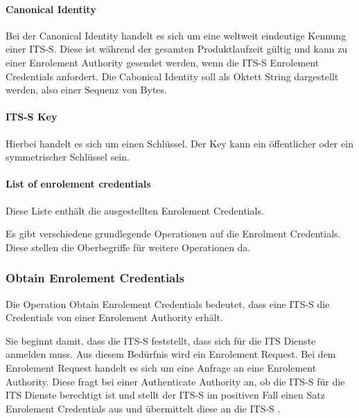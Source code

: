 \paragraph{Canonical Identity} Bei der Canonical Identity handelt es sich um eine weltweit eindeutige Kennung einer \ac{ITS-S}. Diese ist während der gesamten Produktlaufzeit gültig und kann zu einer Enrolement Authority gesendet werden, wenn die \ac{ITS-S} Enrolement Credentials anfordert. Die Cabonical Identity soll als Oktett String dargestellt werden, also einer Sequenz von Bytes.

\paragraph{ITS-S Key}
Hierbei handelt es sich um einen Schlüssel. Der Key kann ein öffentlicher oder ein symmetrischer Schlüssel sein. 

\paragraph{List of enrolement credentials}
Diese Liste enthält die ausgestellten Enrolement Credentials. 

Es gibt verschiedene grundlegende Operationen auf die Enrolment Credentials. Diese stellen die Oberbegriffe für weitere Operationen da. 


 
\subsubsection{Obtain Enrolement Credentials \label{architektur_obtainEnrolementCredentials}}
Die Operation Obtain Enrolement Credentials bedeutet, dass eine \ac{ITS-S} die Credentials von einer Enrolement Authority erhält. 

Sie beginnt damit, dass die \ac{ITS-S} feststellt, dass sich für die \ac{ITS} Dienste anmelden muss. Aus diesem Bedürfnis wird ein Enrolement Request. Bei dem Enrolement Request handelt es sich um eine Anfrage an eine Enrolement Authority. Diese fragt bei einer Authenticate Authority an, ob die \ac{ITS-S} für die \ac{ITS} Dienste berechtigt ist und stellt der \ac{ITS-S} im positiven Fall einen Satz Enrolement Credentials aus und übermittelt diese an die \ac{ITS-S} .  

